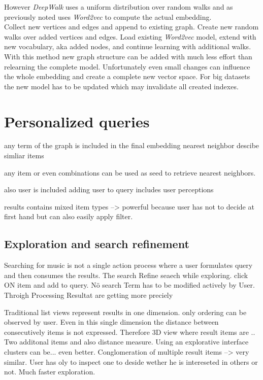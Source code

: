 \documentclass[a4paper]{llncs}
\begin{document}
	However \emph{DeepWalk} uses a uniform distribution over random walks and as previously noted uses \emph{Word2vec} to compute the actual embedding. \\
	
	Collect new vertices and edges and append to existing graph. Create new random walks over added vertices and edges. Load existing \emph{Word2vec} model, extend with new vocabulary, aka added nodes, and continue learning with additional walks. \\
	
	
	
	
	With this method new graph structure can be added with much less effort than relearning the complete model. Unfortunately even small changes can influence the whole embedding and create a complete new vector space. For big datasets the new model has to be updated which may invalidate all created indexes.
	
	
	\section{Personalized queries}
	
	any term of the graph is included in the final embedding
	nearest neighbor descibe simliar items
	
	any item or even combinations can be used as seed to retrieve nearest neighbors.
	
	
	also user is included
	adding user to query includes user perceptions
	
	
	results contains mixed item types --> powerful because user has not to decide at first hand but can also easily apply filter.
	
	\subsection{Exploration and search refinement}
	
	Searching for music is not a single action process where a user formulates query and then consumes the results. The search 
	Refine seaech while exploring. click ON item and add to query. Nö search Term has to be modified actively by User. Throigh Processing Resultat are getting more preciely 
	
	
	Traditional list views represent results in one dimension. only ordering can be observed by user. Even in this single dimension the distance between consecutively items is not expressed.
	Therefore 3D view where result items are ..  Two additonal items and also distance measure. Using an explorative interface clusters can be... even better. 
	Conglomeration of multiple result items --> very similar. User has oly to inspect one to deside wether he is intereseted in others or not. Much faster exploration. 
	
\end{document}

